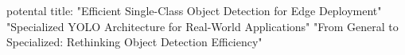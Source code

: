 potental title:
"Efficient Single-Class Object Detection for Edge Deployment"
"Specialized YOLO Architecture for Real-World Applications"
"From General to Specialized: Rethinking Object Detection Efficiency"
